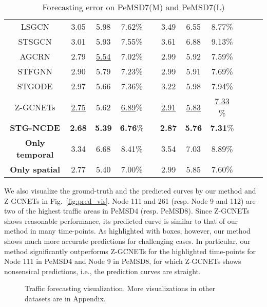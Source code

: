 \documentclass[letterpaper]{article} \usepackage{aaai22}  \usepackage{times}  \usepackage{helvet}  \usepackage{courier}  \usepackage[hyphens]{url}  \usepackage{graphicx} \urlstyle{rm} \def\UrlFont{\rm}  \usepackage{natbib}  \usepackage{caption} \DeclareCaptionStyle{ruled}{labelfont=normalfont,labelsep=colon,strut=off} \frenchspacing  \setlength{\pdfpagewidth}{8.5in}  \setlength{\pdfpageheight}{11in}  \usepackage{stfloats}
\begin{document}
\begin{table}[!ht]
\begin{tabular}{ccccccc c ccc}
        LSGCN                   & 3.05 &  5.98 &  7.62\%        && 3.49 &  6.55 &  8.77\%          \\       
        STSGCN                  & 3.01 &  5.93 &  7.55\%        && 3.61 &  6.88 &  9.13\%          \\        
        AGCRN                   & 2.79 & \underline{5.54} & 7.02\%   && 2.99 & 5.92 & 7.59\%        \\
        STFGNN                  & 2.90 & 5.79 & 7.23\%          && 2.99 & 5.91 & 7.69\%          \\        
        STGODE                  & 2.97 & 5.66 & 7.36\%         && 3.22 & 5.98 & 7.94\%        \\
        Z-GCNETs                & \underline{2.75} & 5.62 & \underline{6.89}\%  && \underline{2.91} & \underline{5.83} & \underline{7.33}                    \%  \\
        \hline
        \textbf{STG-NCDE}           & \textbf{2.68}    & \textbf{5.39}    &  \textbf{6.76}\% && \textbf{2.87} & \textbf{5.76} &  \textbf{7.31}\%\\
        \textbf{Only temporal}  & 3.34 & 6.68 & 8.41\%          && 3.54 & 7.03 & 8.89\%  \\
        \textbf{Only spatial}   & 2.77 & 5.40 & 7.00\%          && 2.99 & 5.85 & 7.60\%  \\
        \hline
    \end{tabular}
    \caption{Forecasting error on PeMSD7(M) and PeMSD7(L)}
    \label{tab:main_exp_2}
\end{table}


We also visualize the ground-truth and the predicted curves by our method and Z-GCNETs in Fig.~\ref{fig:pred_vis}. Node 111 and 261 (resp. Node 9 and 112) are two of the highest traffic areas in PeMSD4 (resp. PeMSD8). Since Z-GCNETs shows reasonable performance, its predicted curve is similar to that of our method in many time-points. As highlighted with boxes, however, our method shows much more accurate predictions for challenging cases. In particular, our method significantly outperforms Z-GCNETs for the highlighted time-points for Node 111 in PeMSD4 and Node 9 in PeMSD8, for which Z-GCNETs shows nonsensical predictions, i.e., the prediction curves are straight. 

\begin{figure}[t]
    \centering
    \caption{Traffic forecasting visualization. More visualizations in other datasets are in Appendix.}   \label{fig:pred_vis}

    \label{fig:pred_vis_pemsd8}
\end{figure}
\end{document}
